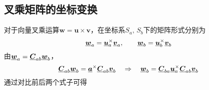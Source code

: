 \subsection{叉乘矩阵的坐标变换}
\label{叉乘矩阵的坐标变换}
对于向量叉乘运算$\bm{w} = \bm{u} \times \bm{v}$，在坐标系$S_a,\, S_b$下的矩阵形式分别为
\begin{equation*}
	\underline{\bm{w}}_a = \underline{\bm{u}}_a^\times \underline{\bm{v}}_a, \qquad \underline{\bm{w}}_b = \underline{\bm{u}}_b^\times \underline{\bm{v}}_b
\end{equation*}
由$\underline{\bm{w}}_a = \underline{\bm{C}}_{ab} \underline{\bm{w}}_b$，
\begin{equation*}
	\underline{\bm{C}}_{ab} \underline{\bm{w}}_b = \underline{\bm{a}}^\times \underline{\bm{C}}_{ab} \underline{\bm{v}}_b \quad \Rightarrow \quad \underline{\bm{w}}_b = \underline{\bm{C}}_{ba} \underline{\bm{u}}_a^\times \underline{\bm{C}}_{ab} \underline{\bm{v}}_b
\end{equation*}
通过对比前后两个式子可得



